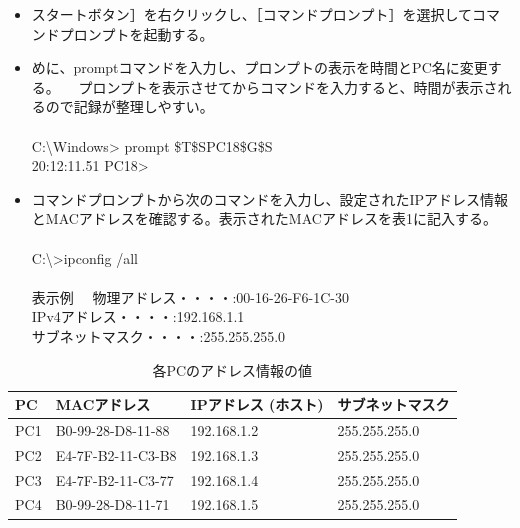 \documentclass[10pt]{article}
\begin{document}
\begin{enumerate}
\begin{itemize}
                \item スタートボタン］を右クリックし、［コマンドプロンプト］を選択してコマンドプロンプトを起動する。
                \item めに、promptコマンドを入力し、プロンプトの表示を時間とPC名に変更する。 　プロンプトを表示させてからコマンドを入力すると、時間が表示されるので記録が整理しやすい。
                     \\\\
                    C:\textbackslash Windows> prompt \$T\$SPC18\$G\$S \\
                    20:12:11.51 PC18>
                    \\
                \item コマンドプロンプトから次のコマンドを入力し、設定されたIPアドレス情報とMACアドレスを確認する。表示されたMACアドレスを表1に記入する。
                \\\\
                C:\textbackslash>ipconfig /all
                \\\\
                表示例 　物理アドレス・・・・:00-16-26-F6-1C-30 \\
                IPv4アドレス・・・・:192.168.1.1 \\
                サブネットマスク・・・・:255.255.255.0 \\
                    
            \end{itemize}
            \begingroup
            \setlength{\tabcolsep}{5pt} %
            \renewcommand{\arraystretch}{1.5} %
            \begin{table}[H]
            \centering
        	\caption{各PCのアドレス情報の値}
        	\begin{tabular}{|l|l|l|l|}
        	    \hline
        	    PC & MACアドレス & IPアドレス (ホスト) & サブネットマスク\\[0.5ex]
        		\hline\hline
        	PC1 & B0-99-28-D8-11-88 & 192.168.1.2 & 255.255.255.0 \\ \hline
            PC2 & E4-7F-B2-11-C3-B8 & 192.168.1.3 & 255.255.255.0 \\ \hline
            PC3 & E4-7F-B2-11-C3-77 & 192.168.1.4 & 255.255.255.0 \\ \hline
            PC4 & B0-99-28-D8-11-71 & 192.168.1.5 & 255.255.255.0　\\ \hline
        	\end{tabular}
        \end{table} 
        \endgroup
        

\end{enumerate}
\end{document}
